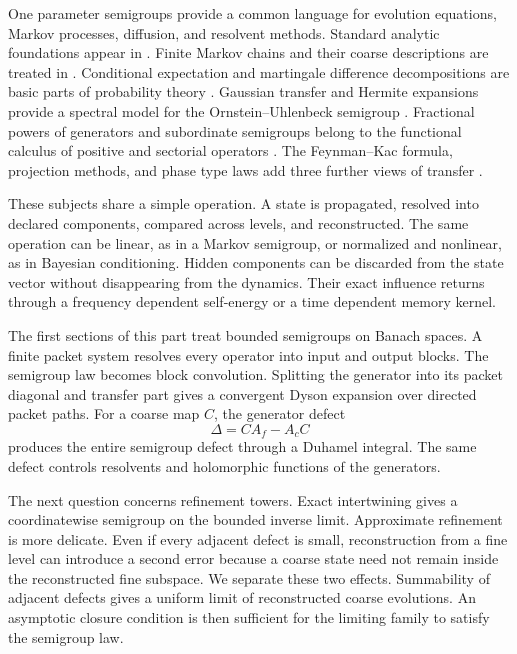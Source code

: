 \documentclass[11pt,letterpaper]{article}
\theoremstyle{plain}
\theoremstyle{plain}
\theoremstyle{plain}
\theoremstyle{definition}
\theoremstyle{definition}
\theoremstyle{definition}
\theoremstyle{definition}
\theoremstyle{definition}
\theoremstyle{remark}
\theoremstyle{remark}
\theoremstyle{remark}
\theoremstyle{remark}
\theoremstyle{remark}
\theoremstyle{remark}
\begin{document}
One parameter semigroups provide a common language for evolution equations, Markov processes, diffusion, and resolvent methods. Standard analytic foundations appear in \cite{Pazy1983,EngelNagel2000}. Finite Markov chains and their coarse descriptions are treated in \cite{KemenySnell1960,Norris1997,RogersPitman1981}. Conditional expectation and martingale difference decompositions are basic parts of probability theory \cite{Williams1991}. Gaussian transfer and Hermite expansions provide a spectral model for the Ornstein--Uhlenbeck semigroup \cite{Janson1997}. Fractional powers of generators and subordinate semigroups belong to the functional calculus of positive and sectorial operators \cite{Balakrishnan1960,SchillingSongVondracek2012}. The Feynman--Kac formula, projection methods, and phase type laws add three further views of transfer \cite{Kac1949,Feshbach1958,Zwanzig1961,Neuts1981}.

These subjects share a simple operation. A state is propagated, resolved into declared components, compared across levels, and reconstructed. The same operation can be linear, as in a Markov semigroup, or normalized and nonlinear, as in Bayesian conditioning. Hidden components can be discarded from the state vector without disappearing from the dynamics. Their exact influence returns through a frequency dependent self-energy or a time dependent memory kernel.

The first sections of this part treat bounded semigroups on Banach spaces. A finite packet system resolves every operator into input and output blocks. The semigroup law becomes block convolution. Splitting the generator into its packet diagonal and transfer part gives a convergent Dyson expansion over directed packet paths. For a coarse map \(C\), the generator defect
\[
\Delta=CA_f-A_cC
\]
produces the entire semigroup defect through a Duhamel integral. The same defect controls resolvents and holomorphic functions of the generators.

The next question concerns refinement towers. Exact intertwining gives a coordinatewise semigroup on the bounded inverse limit. Approximate refinement is more delicate. Even if every adjacent defect is small, reconstruction from a fine level can introduce a second error because a coarse state need not remain inside the reconstructed fine subspace. We separate these two effects. Summability of adjacent defects gives a uniform limit of reconstructed coarse evolutions. An asymptotic closure condition is then sufficient for the limiting family to satisfy the semigroup law.
\end{document}
